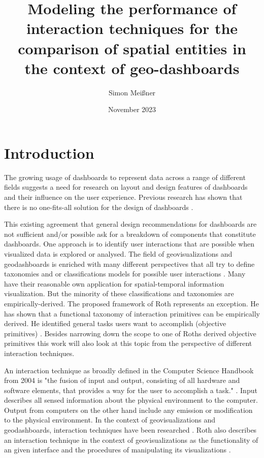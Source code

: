 \documentclass[12pt, twoside]{article}
\title{Modeling the performance of  interaction techniques for the comparison of spatial entities in the context of geo-dashboards}
\author{Simon Meißner}
\date{November 2023}
\begin{document}
\maketitle
\newpage
\begin{abstract}
\end{abstract}
\newpage
\tableofcontents



\newpage

\section{Introduction}
The growing usage of dashboards to represent data across a range of different 
fields suggests a need for research on layout and design features of dashboards 
and their influence on the user experience. Previous research has shown that there is
no one-fits-all solution for the design of dashboards \citep*{Yigitbasioglu.2012,Sarikaya.2018}.

This existing agreement that general design recommendations for dashboards are not sufficient
and/or possible ask for a breakdown of components that constitute dashboards. One approach is
to identify user interactions that are possible when visualized data is explored or analysed.
The field of geovisualizations and geodashboards is enriched with many different perspectives that
all try to define taxonomies and or classifications models for possible user interactions
\citep*{Andrienko.2003,Crampton.2002}. Many have their reasonable own application for
spatial-temporal information visualization. But the minority of these classifications and
taxonomies are empirically-derived. The proposed framework of Roth represents an exception.
He has shown that a functional taxonomy of interaction primitives can be empirically derived.
He identified general tasks users want to accomplish (objective primitives) \citep{Roth.2013}.
Besides narrowing down the scope to one of Roths derived objective primitives this work will also
look at this topic from the perspective of different interaction techniques.

An interaction technique as broadly defined in the Computer Science Handbook from 2004
is "the fusion of input and output, consisting of all hardware and software elements, 
that provides a way for the user to accomplish a task." \citep*{Hinckley.2004}. Input describes
all sensed information about the physical environment to the computer. Output from computers on the
other hand include any emission or modification to the physical environment. In the
context of geovisualizations and geodashboards, interaction techniques have been
researched \citep*{Keim.2005,Lobo.2015,vanTonder.2011}.
Roth also describes an interaction technique in the context of geovisualizations as the
functionality of an given interface and the procedures of manipulating its
visualizations \citep{Roth.2013}.
\end{document}
